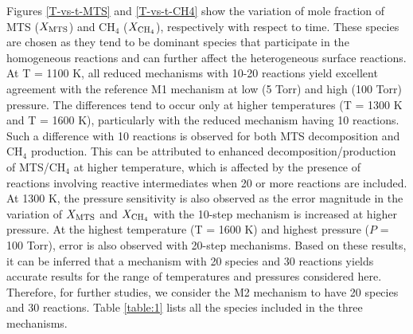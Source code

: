 \documentclass[final, letterpaper, square, comma, numbers, sort&compress]{elsarticle}
\begin{document}
Figures \ref{T-vs-t-MTS} and \ref{T-vs-t-CH4} show the variation of mole fraction of MTS ($X_{\rm MTS}$) and CH$_4$ ($X_{\rm CH_4}$), respectively with respect to time. These species are chosen as they tend to be dominant species that participate in the homogeneous reactions and can further affect the heterogeneous surface reactions. At T = 1100 K, all reduced mechanisms with 10-20 reactions yield excellent agreement with the reference M1 mechanism at low (5 Torr) and high (100 Torr) pressure. The differences tend to occur only at higher temperatures (T = 1300 K and T = 1600 K), particularly with the reduced mechanism having 10 reactions. Such a difference with 10 reactions is observed for both MTS decomposition and CH$_4$ production. This can be attributed to enhanced decomposition/production of MTS/CH$_4$ at higher temperature, which is affected by the presence of reactions involving reactive intermediates when 20 or more reactions are included. At 1300 K, the pressure sensitivity is also observed as the error magnitude in the variation of $X_{\rm MTS}$ and $X_{\rm CH_4}$ with the 10-step mechanism is increased at higher pressure. At the highest temperature (T = 1600 K) and highest pressure ($P$ = 100 Torr), error is also observed with 20-step mechanisms. Based on these results, it can be inferred that a mechanism with 20 species and 30 reactions yields accurate results for the range of temperatures and pressures considered here. Therefore, for further studies, we consider the M2 mechanism to have 20 species and 30 reactions. Table \ref{table:1} lists all the species included in the three mechanisms. 
\end{document}
